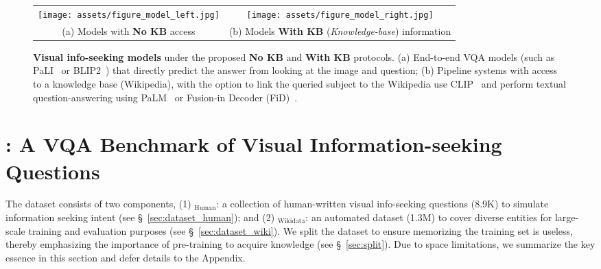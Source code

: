 \documentclass[11pt]{article}
\begin{document}
\begin{figure*}[!htbp]
    \centering
    \vspace{-5mm}
    \begin{tabular}{c@{\quad}c}
        \tabcolsep 0pt
        \texttt{[image: assets/figure\_model\_left.jpg]} & \texttt{[image: assets/figure\_model\_right.jpg]} \\
        {\footnotesize (a) Models with \textbf{No KB} access} & {\footnotesize (b) Models \textbf{With KB} {(\small \textit{Knowledge-base})} information}
    \end{tabular}
\caption{
    \textbf{Visual info-seeking models} under the proposed \textbf{No KB} and \textbf{With KB} protocols. 
    (a) End-to-end VQA models (such as PaLI~\cite{chen2022pali} or BLIP2~\cite{li2023blip}) that directly predict the answer from looking at the image and question; 
    (b) Pipeline systems with access to a knowledge base (\eg Wikipedia), with the option to link the queried subject to the Wikipedia use CLIP~\cite{radford2021clip} and perform textual question-answering using PaLM~\citep{chowdhery2022palm} or Fusion-in Decoder (FiD)~\cite{izacard2020fid}. 
    }
\label{fig:models}
\end{figure*} \section{{\infoseek}: A VQA Benchmark of Visual Information-seeking Questions}
\label{sec:dataset}
The \ourdataset dataset consists of two components, (1) \ourdataset$_{\text{Human}}$: a collection of human-written visual info-seeking questions (8.9K) to simulate information seeking intent (see \S~\ref{sec:dataset_human}); and (2) \ourdataset$_{\text{Wikidata}}$: an automated dataset (1.3M) to cover diverse entities for large-scale training and evaluation purposes (see \S~\ref{sec:dataset_wiki}).
We split the dataset to ensure memorizing the training set is useless, thereby emphasizing the importance of pre-training to acquire knowledge (see \S~\ref{sec:split}). Due to space limitations, we summarize the key essence in this section and defer details to the Appendix.
\end{document}
